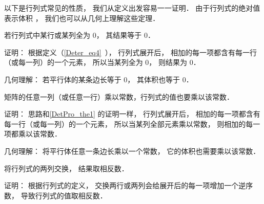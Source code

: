 

以下是行列式常见的性质， 我们从定义出发容易一一证明． 由于行列式的绝对值表示体积%
， 我们也可以从几何上理解这些定理．

\begin{theorem}{ } \label{DetPro_the1}
若行列式中某行或某列全为 0， 其结果等于 0．
\end{theorem}
证明： 根据定义（\autoref{Deter_eq4}~）， 行列式展开后， 相加的每一项都含有每一行（或每一列）的一个元素， 所以当某列全为 0， 则结果为 0．

几何理解： 若平行体的某条边长等于 0， 其体积也等于 0．

\begin{theorem}{ } \label{DetPro_the3}
矩阵的任意一列（或任意一行）乘以常数，行列式的值也要乘以该常数．
\end{theorem}
证明： 思路和\autoref{DetPro_the1} 的证明一样， 行列式展开后， 相加的每一项都含有每一行（或每一列）的一个元素， 所以当某列全部元素乘以常数， 则相加的每一项都乘以该常数．

几何理解： 将平行体任意一条边长乘以一个常数， 它的体积也需要乘以该常数．

\begin{theorem}{ }\label{DetPro_the6}
将行列式的两列交换， 结果取相反数．
\end{theorem}
证明： 根据行列式的定义， 交换两行或两列会给展开后的每一项增加一个逆序数， 导致行列式的值取相反数．

